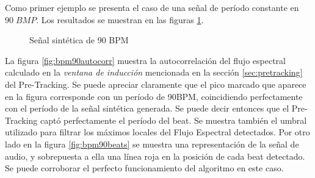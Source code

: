 \documentclass[12pt,a4paper,titlepage]{report}
\begin{document}
Como primer ejemplo se presenta el caso de una señal de período constante en $90\;BMP$. Los resultados se muestran en las figuras \ref{fig:90BPM}.

\begin{figure} [h!]
\centering
  \caption{Señal sintética de 90 BPM}
  \label{fig:90BPM}
\end{figure}


La figura \ref{fig:bpm90autocorr} muestra la autocorrelación del flujo espectral calculado en la \emph{ventana de inducción} mencionada en la sección \ref{sec:pretracking} del Pre-Tracking. Se puede apreciar claramente que el pico marcado que aparece en la figura corresponde con un período de 90BPM, coincidiendo perfectamente con el período de la señal sintética generada. Se puede decir entonces que el Pre-Tracking captó perfectamente el período del beat. Se muestra también el umbral utilizado para filtrar los máximos locales del Flujo Espectral detectados. Por otro lado en la figura \ref{fig:bpm90beats} se muestra una representación de la señal de audio, y sobrepuesta a ella una línea roja en la posición de cada beat detectado. Se puede corroborar el perfecto funcionamiento del algoritmo en este caso.\\
\end{document}
